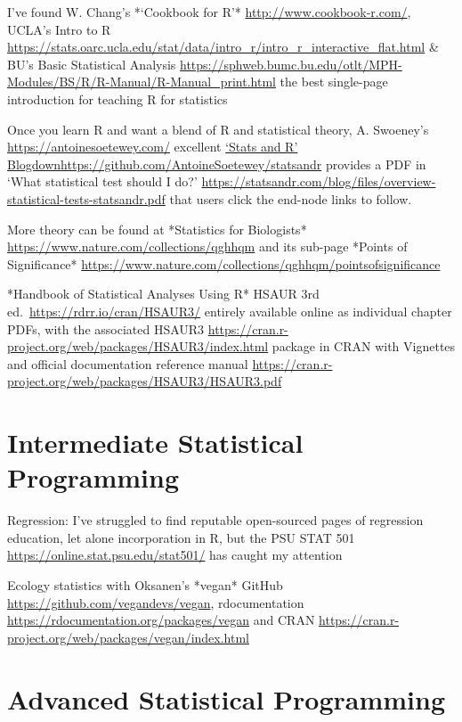 \documentclass[
]{book}
\begin{document}
I've found W. Chang's *`Cookbook for R'* \url{http://www.cookbook-r.com/}, UCLA's Intro to R \url{https://stats.oarc.ucla.edu/stat/data/intro_r/intro_r_interactive_flat.html} \& BU's Basic Statistical Analysis \url{https://sphweb.bumc.bu.edu/otlt/MPH-Modules/BS/R/R-Manual/R-Manual_print.html} the best single-page introduction for teaching R for statistics

Once you learn R and want a blend of R and statistical theory, A. Swoeney's \url{https://antoinesoetewey.com/} excellent \href{\%5Bhttps://github.com/AntoineSoetewey/statsandr}{`Stats and R' Blogdown}\url{https://github.com/AntoineSoetewey/statsandr} provides a PDF in `What statistical test should I do?' \url{https://statsandr.com/blog/files/overview-statistical-tests-statsandr.pdf} that users click the end-node links to follow.

More theory can be found at *Statistics for Biologists* \url{https://www.nature.com/collections/qghhqm} and its sub-page *Points of Significance* \url{https://www.nature.com/collections/qghhqm/pointsofsignificance}

*Handbook of Statistical Analyses Using R* HSAUR 3rd ed.~\url{https://rdrr.io/cran/HSAUR3/} entirely available online as individual chapter PDFs, with the associated HSAUR3 \url{https://cran.r-project.org/web/packages/HSAUR3/index.html} package in CRAN with Vignettes and official documentation reference manual \url{https://cran.r-project.org/web/packages/HSAUR3/HSAUR3.pdf}

\section{Intermediate Statistical Programming}\label{intermediate-statistical-programming}

Regression: I've struggled to find reputable open-sourced pages of regression education, let alone incorporation in R, but the PSU STAT 501 \url{https://online.stat.psu.edu/stat501/} has caught my attention

Ecology statistics with Oksanen's *vegan* GitHub \url{https://github.com/vegandevs/vegan}, rdocumentation \url{https://rdocumentation.org/packages/vegan} and CRAN \url{https://cran.r-project.org/web/packages/vegan/index.html}

\section{Advanced Statistical Programming}\label{advanced-statistical-programming}
\end{document}
